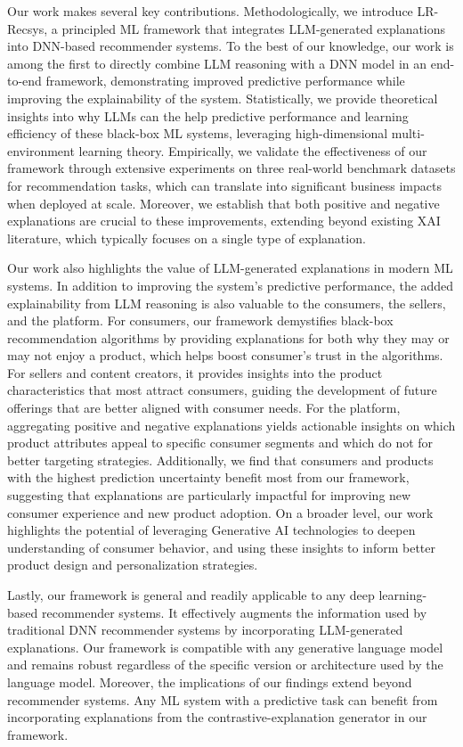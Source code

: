 Our work makes several key contributions. Methodologically, we introduce LR-Recsys, a principled ML framework that integrates LLM-generated explanations into DNN-based recommender systems. To the best of our knowledge, our work is among the first to directly combine LLM reasoning with a DNN model in an end-to-end framework, demonstrating improved predictive performance while improving the explainability of the system. Statistically, we provide theoretical insights into why LLMs can the help predictive performance and learning efficiency of these black-box ML systems, leveraging high-dimensional multi-environment learning theory. Empirically, we validate the effectiveness of our framework through extensive experiments on three real-world benchmark datasets for recommendation tasks, which can translate into significant business impacts when deployed at scale. Moreover, we establish that both positive and negative explanations are crucial to these improvements, extending beyond existing XAI literature, which typically focuses on a single type of explanation.

Our work also highlights the value of LLM-generated explanations in modern ML systems. In addition to improving the system's predictive performance, the added explainability from LLM reasoning is also valuable to the consumers, the sellers, and the platform.  For consumers, our framework demystifies black-box recommendation algorithms by providing explanations for both why they may or may not enjoy a product, which helps boost consumer's trust in the algorithms. For sellers and content creators, it provides insights into the product characteristics that most attract consumers, guiding the development of future offerings that are better aligned with consumer needs. For the platform, aggregating positive and negative explanations yields actionable insights on which product attributes appeal to specific consumer segments and which do not for better targeting strategies. Additionally, we find that consumers and products with the highest prediction uncertainty benefit most from our framework, suggesting that explanations are particularly impactful for improving new consumer experience and new product adoption. On a broader level, our work highlights the potential of leveraging Generative AI technologies to deepen understanding of consumer behavior, and using these insights to inform better product design and personalization strategies.

Lastly, our framework is general and readily applicable to any deep learning-based recommender systems. It effectively augments the information used by traditional DNN recommender systems by incorporating LLM-generated explanations. Our framework is compatible with any generative language model and remains robust regardless of the specific version or architecture used by the language model. Moreover, the implications of our findings extend beyond recommender systems. Any ML system with a predictive task can benefit from incorporating explanations from the contrastive-explanation generator in our framework. 

